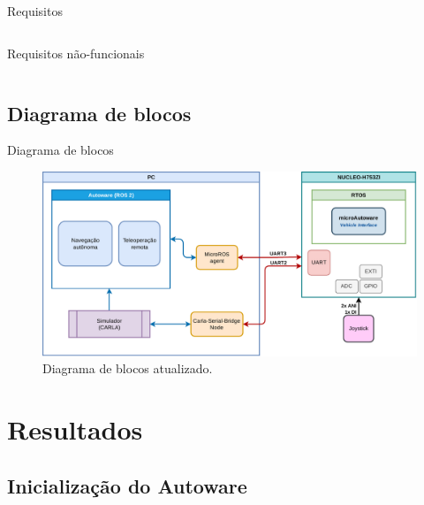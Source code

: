 \documentclass{if-beamer}
\begin{document}
\begin{frame}{Requisitos}
\begin{columns}
\begin{column}{0.5\textwidth}
\begin{block}{Requisitos não-funcionais}
			\end{block}
			
		\end{column}
		
	\end{columns}
	
\pause
	
\end{frame}

\subsection*{Diagrama de blocos}

\begin{frame}{Diagrama de blocos}
	
	\begin{figure}[H]
		\centering
		\includegraphics[width=0.9\linewidth]{block_diagram}
		\caption{Diagrama de blocos atualizado.}
		\label{fig:block_diagram}
	\end{figure}
	
\end{frame}






\section{Resultados}

\subsection*{Inicialização do Autoware}
\end{document}
